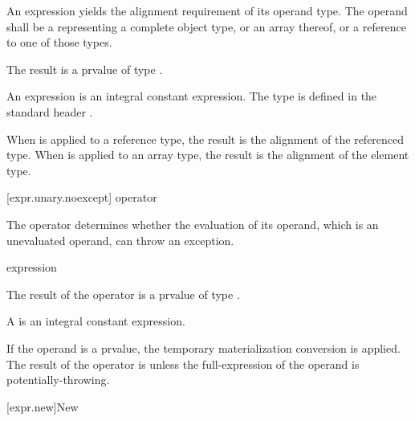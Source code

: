 \pnum
{}%
%
An  expression yields the alignment requirement
of its operand type. The operand shall be a 
representing a complete object type, or an array thereof, or a reference
to one of those types.

\pnum
The result is a prvalue of type .
\begin{note}
An  expression
is an integral constant expression.
The type  is defined in the standard header
.
\end{note}

\pnum
When  is applied to a reference type, the result
is the alignment of the referenced type. When 
is applied to an array type, the result is the alignment of the
element type.

[expr.unary.noexcept]{ operator}

\pnum
{}%
%
The  operator determines whether the evaluation of its operand,
which is an unevaluated operand, can throw an
exception.

\begin{bnf}
\br
   \terminal{(} expression \terminal{)}
\end{bnf}

\pnum
The result of the  operator is a prvalue of type .
\begin{note}
A 
is an integral constant expression.
\end{note}

\pnum
If the operand is a prvalue,
the temporary materialization conversion is applied.
The result of the  operator is 
unless the full-expression of the operand
is potentially-throwing.

[expr.new]{New}

